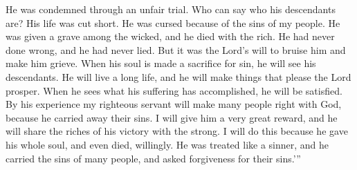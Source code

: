 He was condemned through an unfair trial. Who can say who his descendants are? His life was cut short. He was cursed because of the sins of my people.
\bverse \iffalse And he made his grave with the wicked, and with the rich in his death; because he had done no evil, neither was any deceit in his mouth. \fi
He was given a grave among the wicked, and he died with the rich. He had never done wrong, and he had never lied.
\bverse \iffalse Yet it pleased the Lord to bruise him; he hath put him to grief; when thou shalt make his soul an offering for sin he shall see his seed, he shall prolong his days, and the pleasure of the Lord shall prosper in his hand. \fi
But it was the Lord's will to bruise him and make him grieve. When his soul is made a sacrifice for sin, he will see his descendants. He will live a long life, and he will make things that please the Lord prosper.
\bverse \iffalse He shall see the travail of his soul, and shall be satisfied; by his knowledge shall my righteous servant justify many; for he shall bear their iniquities. \fi
When he sees what his suffering has accomplished, he will be satisfied. By his experience my righteous servant will make many people right with God, because he carried away their sins.
\bverse \iffalse Therefore will I divide him a portion with the great, and he shall divide the spoil with the strong; because he hath poured out his soul unto death; and he was numbered with the transgressors; and he bore the sins of many, and made intercession for the transgressors. \fi
I will give him a very great reward, and he will share the riches of his victory with the strong. I will do this because he gave his whole soul, and even died, willingly. He was treated like a sinner, and he carried the sins of many people, and asked forgiveness for their sins.\rq ''

